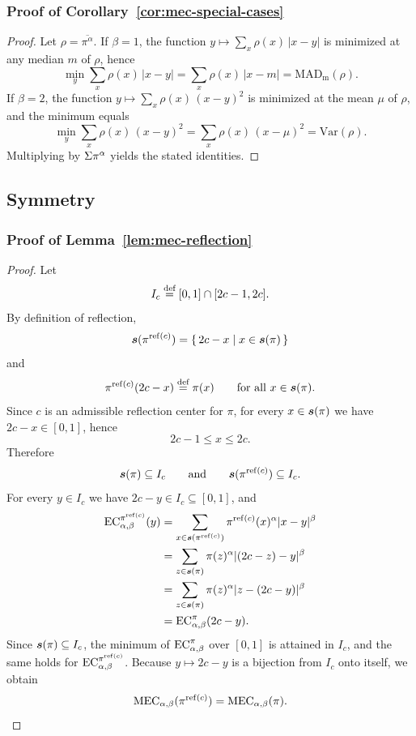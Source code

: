 \subsubsection{Proof of Corollary~\ref{cor:mec-special-cases}}
\label{appendix:proof-cor-mec-special-cases}
\specialCases*
\begin{proof}
Let $\rho=\overline{\pi^\alpha}$. If $\beta=1$, the function $y\mapsto \sum_x \rho(x)\,|x-y|$ is minimized at any
median $m$ of $\rho$, hence
\[
\min_y \sum_x \rho(x)\,|x-y|=\sum_x \rho(x)\,|x-m|
=\mathrm{MAD}_{\mathrm{m}}(\rho).
\]
If $\beta=2$, the function $y\mapsto \sum_x \rho(x)\,(x-y)^2$ is minimized at
the mean $\mu$ of $\rho$, and the minimum equals
\[
\min_y \sum_x \rho(x)\,(x-y)^2=\sum_x \rho(x)\,(x-\mu)^2=\mathrm{Var}(\rho).
\]
Multiplying by $\Sigma \pi^\alpha$ yields the stated identities.
\end{proof}

\subsection{Symmetry}

\subsubsection{Proof of Lemma~\ref{lem:mec-reflection}}
\label{appendix:proof-mec-reflection}

\mecReflection*
\begin{proof}
Let
\[
I_c \stackrel{\text{def}}{=} [0,1]\cap[2c-1,2c].
\]
By definition of reflection,
\[
\boldsymbol{s}(\pi^{\mathrm{ref}(c)})
=
\{\,2c-x \mid x\in\boldsymbol{s}(\pi)\,\}
\]
and
\[
\pi^{\mathrm{ref}(c)}(2c-x)\stackrel{\text{def}}{=} \pi(x)
\qquad\text{for all }x\in\boldsymbol{s}(\pi).
\]
Since $c$ is an admissible reflection center for $\pi$, for every
$x\in\boldsymbol{s}(\pi)$ we have $2c-x\in[0,1]$, hence
\[
2c-1\le x\le 2c.
\]
Therefore
\[
\boldsymbol{s}(\pi)\subseteq I_c
\qquad\text{and}\qquad
\boldsymbol{s}(\pi^{\mathrm{ref}(c)})\subseteq I_c.
\]
For every $y\in I_c$ we have $2c-y\in I_c\subseteq[0,1]$, and
\[
\begin{aligned}
\EC[\alpha,\beta][\pi^{\mathrm{ref}(c)}](y)
&=
\sum_{x\in\support(\pi^{\mathrm{ref}(c)})}
\pi^{\mathrm{ref}(c)}(x)^\alpha |x-y|^\beta \\
&=
\sum_{z\in\support(\pi)}
\pi(z)^\alpha |(2c-z)-y|^\beta \\
&=
\sum_{z\in\support(\pi)}
\pi(z)^\alpha |z-(2c-y)|^\beta \\
&=
\EC(2c-y).
\end{aligned}
\]
Since $\boldsymbol{s}(\pi)\subseteq I_c$, the minimum of $\EC$ over $[0,1]$
is attained in $I_c$, and the same holds for $\EC[\alpha,\beta][\pi^{\mathrm{ref}(c)}]$.
Because $y\mapsto 2c-y$ is a bijection from $I_c$ onto itself, we obtain
\[
\MEC[\alpha,\beta](\pi^{\mathrm{ref}(c)})
=
\MEC[\alpha,\beta](\pi).
\]
\end{proof}

